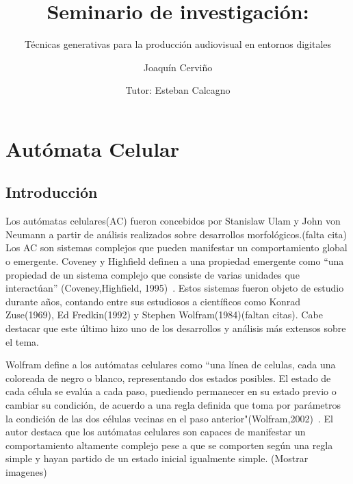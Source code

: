 \documentclass[16pt,spanish]{article}
\author{
	Joaquín Cerviño\\
	\and
	Tutor: Esteban Calcagno\\
}
\title{Seminario de investigación: }
\subtitle{Técnicas generativas para la producción audiovisual en entornos digitales}
\begin{document}
\maketitle
{}
\newpage
{}

\section{Autómata Celular}
\subsection{Introducción}

		Los autómatas celulares(AC) fueron concebidos por Stanislaw Ulam y John von
Neumann a partir de análisis realizados sobre desarrollos morfológicos.(falta cita) Los AC son
sistemas complejos que pueden manifestar un comportamiento global o emergente.
Coveney y Highfield definen a una propiedad emergente como “una propiedad de un
sistema complejo que consiste de varias unidades que interactúan” (Coveney,Highfield,
1995)~\cite{highfield1996frontiers}. Estos sistemas fueron objeto de estudio durante años, contando entre sus
estudiosos a científicos como Konrad Zuse(1969), Ed Fredkin(1992) y Stephen
Wolfram(1984)(faltan citas). Cabe destacar que este último hizo uno de los desarrollos y análisis más
extensos sobre el tema. 		

		Wolfram define a los autómatas celulares como ``una línea de celulas, cada una coloreada de negro o blanco, representando dos estados posibles. El estado de cada célula se evalúa a cada paso, puediendo permanecer en su estado previo o cambiar su condición, de acuerdo a una regla definida que toma por parámetros la condición de las dos células vecinas en el paso anterior"(Wolfram,2002)~\cite{wolfram2002new}. El autor destaca que los autómatas celulares son capaces de manifestar un comportamiento altamente complejo pese a que se comporten según una regla simple y hayan partido de un estado inicial igualmente simple. (Mostrar imagenes) 
		
\end{document}
